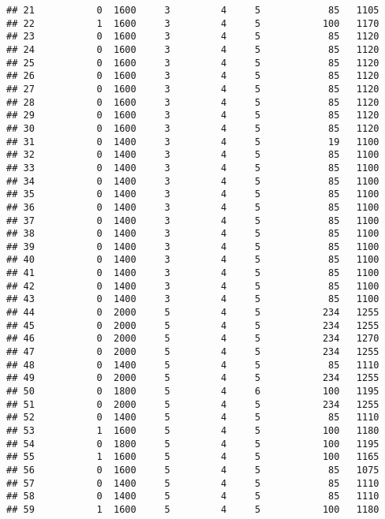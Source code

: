 \documentclass[]{article}
\begin{document}
\begin{verbatim}
## 21           0  1600     3         4     5            85   1105
## 22           1  1600     3         4     5           100   1170
## 23           0  1600     3         4     5            85   1120
## 24           0  1600     3         4     5            85   1120
## 25           0  1600     3         4     5            85   1120
## 26           0  1600     3         4     5            85   1120
## 27           0  1600     3         4     5            85   1120
## 28           0  1600     3         4     5            85   1120
## 29           0  1600     3         4     5            85   1120
## 30           0  1600     3         4     5            85   1120
## 31           0  1400     3         4     5            19   1100
## 32           0  1400     3         4     5            85   1100
## 33           0  1400     3         4     5            85   1100
## 34           0  1400     3         4     5            85   1100
## 35           0  1400     3         4     5            85   1100
## 36           0  1400     3         4     5            85   1100
## 37           0  1400     3         4     5            85   1100
## 38           0  1400     3         4     5            85   1100
## 39           0  1400     3         4     5            85   1100
## 40           0  1400     3         4     5            85   1100
## 41           0  1400     3         4     5            85   1100
## 42           0  1400     3         4     5            85   1100
## 43           0  1400     3         4     5            85   1100
## 44           0  2000     5         4     5           234   1255
## 45           0  2000     5         4     5           234   1255
## 46           0  2000     5         4     5           234   1270
## 47           0  2000     5         4     5           234   1255
## 48           0  1400     5         4     5            85   1110
## 49           0  2000     5         4     5           234   1255
## 50           0  1800     5         4     6           100   1195
## 51           0  2000     5         4     5           234   1255
## 52           0  1400     5         4     5            85   1110
## 53           1  1600     5         4     5           100   1180
## 54           0  1800     5         4     5           100   1195
## 55           1  1600     5         4     5           100   1165
## 56           0  1600     5         4     5            85   1075
## 57           0  1400     5         4     5            85   1110
## 58           0  1400     5         4     5            85   1110
## 59           1  1600     5         4     5           100   1180

\end{verbatim}
\end{document}
